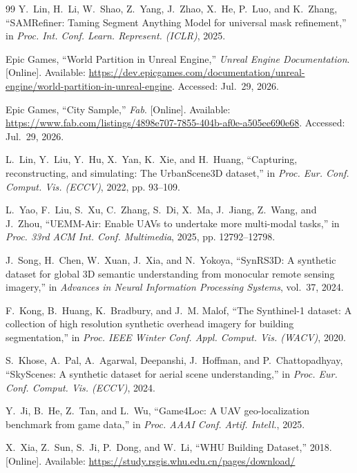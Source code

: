 \documentclass[letterpaper,journal]{IEEEtran}
\begin{document}
\begin{thebibliography}{99}
Y.~Lin, H.~Li, W.~Shao, Z.~Yang, J.~Zhao, X.~He, P.~Luo, and K.~Zhang, ``SAMRefiner: Taming Segment Anything Model for universal mask refinement,'' in \textit{Proc. Int. Conf. Learn. Represent. (ICLR)}, 2025.

Epic Games, ``World Partition in Unreal Engine,'' \textit{Unreal Engine Documentation}. [Online]. Available: \url{https://dev.epicgames.com/documentation/unreal-engine/world-partition-in-unreal-engine}. Accessed: Jul.~29, 2026.

Epic Games, ``City Sample,'' \textit{Fab}. [Online]. Available: \url{https://www.fab.com/listings/4898e707-7855-404b-af0e-a505ee690e68}. Accessed: Jul.~29, 2026.

L.~Lin, Y.~Liu, Y.~Hu, X.~Yan, K.~Xie, and H.~Huang, ``Capturing, reconstructing, and simulating: The UrbanScene3D dataset,'' in \textit{Proc. Eur. Conf. Comput. Vis. (ECCV)}, 2022, pp. 93--109.

L.~Yao, F.~Liu, S.~Xu, C.~Zhang, S.~Di, X.~Ma, J.~Jiang, Z.~Wang, and J.~Zhou, ``UEMM-Air: Enable UAVs to undertake more multi-modal tasks,'' in \textit{Proc. 33rd ACM Int. Conf. Multimedia}, 2025, pp. 12792--12798.

J.~Song, H.~Chen, W.~Xuan, J.~Xia, and N.~Yokoya, ``SynRS3D: A synthetic dataset for global 3D semantic understanding from monocular remote sensing imagery,'' in \textit{Advances in Neural Information Processing Systems}, vol.~37, 2024.

F.~Kong, B.~Huang, K.~Bradbury, and J.~M. Malof, ``The Synthinel-1 dataset: A collection of high resolution synthetic overhead imagery for building segmentation,'' in \textit{Proc. IEEE Winter Conf. Appl. Comput. Vis. (WACV)}, 2020.

S.~Khose, A.~Pal, A.~Agarwal, Deepanshi, J.~Hoffman, and P.~Chattopadhyay, ``SkyScenes: A synthetic dataset for aerial scene understanding,'' in \textit{Proc. Eur. Conf. Comput. Vis. (ECCV)}, 2024.

Y.~Ji, B.~He, Z.~Tan, and L.~Wu, ``Game4Loc: A UAV geo-localization benchmark from game data,'' in \textit{Proc. AAAI Conf. Artif. Intell.}, 2025.

X.~Xia, Z.~Sun, S.~Ji, P.~Dong, and W.~Li, ``WHU Building Dataset,'' 2018. [Online]. Available: \url{https://study.rsgis.whu.edu.cn/pages/download/}


\end{thebibliography}
\end{document}
